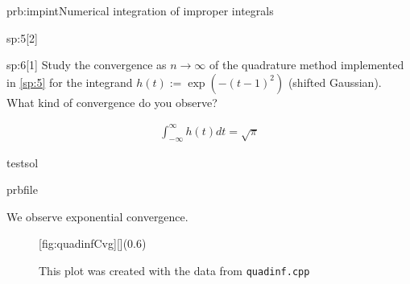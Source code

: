 \begin{samproblem}{prb:impint}{Numerical integration of improper integrals}
\begin{subproblem}{sp:5}[2]
\end{subproblem}

\begin{subproblem}{sp:6}[1]
  Study the convergence as $n \rightarrow \infty$ of the quadrature method implemented in \ref{sp:5} for the integrand 
  $h(t) := \exp(-(t-1)^2)$ (shifted Gaussian). What kind of convergence do you observe?

  \begin{samhint}
    \begin{align}
      \int_{-\infty}^{\infty} h(t) dt = \sqrt{\pi}
    \end{align}
  \end{samhint}

  \begin{samwriteprbpart}{testsol}
    \begin{writeverbatim}{prbfile}
      \begin{samsolution}
        We observe exponential convergence. 
        \begin{figure}
          \centering
          [fig:quadinfCvg][](0.6\textwidth)
          \caption{This plot was created with the data from \texttt{quadinf.cpp}}
        \end{figure}
      \end{samsolution}
    \end{writeverbatim}
  \end{samwriteprbpart}

\end{subproblem}

\end{samproblem}
